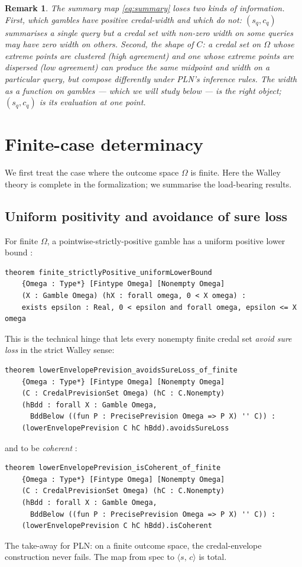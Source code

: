 \documentclass[]{article}
\newtheorem{remark}[theorem]{Remark}
\newcommand{\STV}[2]{\langle #1,\, #2 \rangle}
\begin{document}
\begin{remark}
The summary map \eqref{eq:summary} loses two kinds of information.
First, \emph{which} gambles have positive credal-width and which do
not: $(s_q, c_q)$ summarises a single query but a credal set with
non-zero width on \emph{some} queries may have zero width on others.
Second, the \emph{shape} of $C$: a credal set on $\Omega$ whose extreme
points are clustered (high agreement) and one whose extreme points are
dispersed (low agreement) can produce the same midpoint and width on a
particular query, but compose differently under PLN's inference rules.
The width as a function on gambles --- which we will study below --- is
the right object; $(s_q, c_q)$ is its evaluation at one point.
\end{remark}

\section{Finite-case determinacy}\label{sec:finite}

We first treat the case where the outcome space $\Omega$ is finite. Here
the Walley theory is complete in the formalization; we summarise the
load-bearing results.

\subsection{Uniform positivity and avoidance of sure loss}

For finite $\Omega$, a pointwise-strictly-positive gamble has a uniform
positive lower bound :
\begin{lstlisting}
theorem finite_strictlyPositive_uniformLowerBound
    {Omega : Type*} [Fintype Omega] [Nonempty Omega]
    (X : Gamble Omega) (hX : forall omega, 0 < X omega) :
    exists epsilon : Real, 0 < epsilon and forall omega, epsilon <= X omega
\end{lstlisting}
This is the technical hinge that lets every nonempty finite credal set
\emph{avoid sure loss} in the strict Walley sense:
\begin{lstlisting}
theorem lowerEnvelopePrevision_avoidsSureLoss_of_finite
    {Omega : Type*} [Fintype Omega] [Nonempty Omega]
    (C : CredalPrevisionSet Omega) (hC : C.Nonempty)
    (hBdd : forall X : Gamble Omega,
      BddBelow ((fun P : PrecisePrevision Omega => P X) '' C)) :
    (lowerEnvelopePrevision C hC hBdd).avoidsSureLoss
\end{lstlisting}
and to be \emph{coherent} :
\begin{lstlisting}
theorem lowerEnvelopePrevision_isCoherent_of_finite
    {Omega : Type*} [Fintype Omega] [Nonempty Omega]
    (C : CredalPrevisionSet Omega) (hC : C.Nonempty)
    (hBdd : forall X : Gamble Omega,
      BddBelow ((fun P : PrecisePrevision Omega => P X) '' C)) :
    (lowerEnvelopePrevision C hC hBdd).isCoherent
\end{lstlisting}
The take-away for PLN: on a finite outcome space, the credal-envelope
construction never fails. The map from spec to $\STV{s}{c}$ is total.
\end{document}
